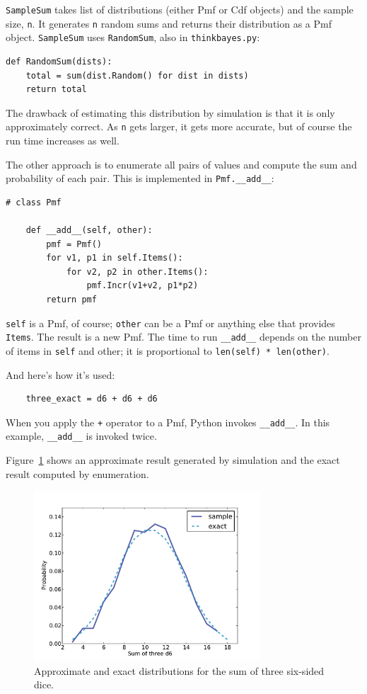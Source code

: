 \documentclass[12pt]{book}
\begin{document}
\verb"SampleSum" takes list of distributions (either Pmf or Cdf
objects) and the sample size, {\tt n}.  It generates {\tt n} random
sums and returns their distribution as a Pmf object.  \verb"SampleSum"
uses \verb"RandomSum", also in \verb"thinkbayes.py":

\begin{verbatim}
def RandomSum(dists):
    total = sum(dist.Random() for dist in dists)
    return total
\end{verbatim}

The drawback of estimating this distribution by simulation is that
it is only approximately correct.  As \verb"n" gets larger, it gets
more accurate, but of course the run time increases as well.

The other approach is to enumerate all pairs of values and
compute the sum and probability of each pair.  This is implemented
in \verb"Pmf.__add__":

\begin{verbatim}
# class Pmf

    def __add__(self, other):
        pmf = Pmf()
        for v1, p1 in self.Items():
            for v2, p2 in other.Items():
                pmf.Incr(v1+v2, p1*p2)
        return pmf
\end{verbatim}

{\tt self} is a Pmf, of course; {\tt other} can be a Pmf or anything
else that provides {\tt Items}.  The result is a new Pmf.  The time to
run \verb"__add__" depends on the number of items in {\tt self} and
other; it is proportional to {\tt len(self) * len(other)}.

And here's how it's used:

\begin{verbatim}
    three_exact = d6 + d6 + d6
\end{verbatim}

When you apply the {\tt +} operator to a Pmf, Python invokes
\verb"__add__".  In this example, \verb"__add__" is invoked twice.

Figure~\ref{fig.dungeons1} shows an approximate result generated
by simulation and the exact result computed by enumeration.

\begin{figure}
\centerline{\includegraphics[height=2.5in]{figs/dungeons1.pdf}}
\caption{Approximate and exact distributions for the sum of
three six-sided dice.}
\label{fig.dungeons1}
\end{figure}
\end{document}
